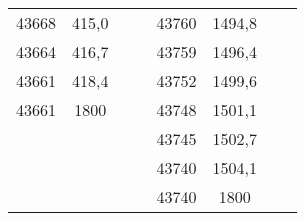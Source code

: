 \documentclass[11pt]{article}
\begin{document}
{{\begin{tabular}{|c|c|c|c|c|c|c|c|}
            \cline{1-2} \cline{5-8} 
            43668 & 415,0 & \multicolumn{1}{c}{} &  & 43760 & 1494,8 & \multicolumn{1}{c}{} & \multicolumn{1}{c}{}\tabularnewline
            \cline{1-2} \cline{5-6} 
            43664 & 416,7 & \multicolumn{1}{c}{} &  & 43759 & 1496,4 & \multicolumn{1}{c}{} & \multicolumn{1}{c}{}\tabularnewline
            \cline{1-2} \cline{5-6} 
            43661 & 418,4 & \multicolumn{1}{c}{} &  & 43752 & 1499,6 & \multicolumn{1}{c}{} & \multicolumn{1}{c}{}\tabularnewline
            \cline{1-2} \cline{5-6} 
            43661 & 1800 & \multicolumn{1}{c}{} &  & 43748 & 1501,1 & \multicolumn{1}{c}{} & \multicolumn{1}{c}{}\tabularnewline
            \cline{1-2} \cline{5-6} 
            \multicolumn{1}{c}{} & \multicolumn{1}{c}{} & \multicolumn{1}{c}{} &  & 43745 & 1502,7 & \multicolumn{1}{c}{} & \multicolumn{1}{c}{}\tabularnewline
            \cline{5-6} 
            \multicolumn{1}{c}{} & \multicolumn{1}{c}{} & \multicolumn{1}{c}{} &  & 43740 & 1504,1 & \multicolumn{1}{c}{} & \multicolumn{1}{c}{}\tabularnewline
            \cline{5-6} 
            \multicolumn{1}{c}{} & \multicolumn{1}{c}{} & \multicolumn{1}{c}{} &  & 43740 & 1800 & \multicolumn{1}{c}{} & \multicolumn{1}{c}{}\tabularnewline
            \cline{5-6} 
        \end{tabular}
    }
}
\vspace*{\fill}
\end{document}
